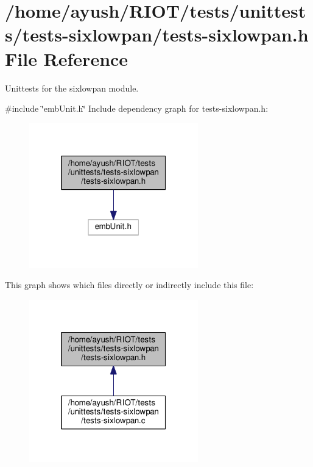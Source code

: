 \hypertarget{tests-sixlowpan_8h}{}\section{/home/ayush/\+R\+I\+O\+T/tests/unittests/tests-\/sixlowpan/tests-\/sixlowpan.h File Reference}
\label{tests-sixlowpan_8h}


Unittests for the {\ttfamily sixlowpan} module.  


{\ttfamily \#include \char`\"{}emb\+Unit.\+h\char`\"{}}\newline
Include dependency graph for tests-\/sixlowpan.h\+:
\nopagebreak
\begin{figure}[H]
\begin{center}
\leavevmode
\includegraphics[width=208pt]{tests-sixlowpan_8h__incl}
\end{center}
\end{figure}
This graph shows which files directly or indirectly include this file\+:
\nopagebreak
\begin{figure}[H]
\begin{center}
\leavevmode
\includegraphics[width=208pt]{tests-sixlowpan_8h__dep__incl}
\end{center}
\end{figure}
